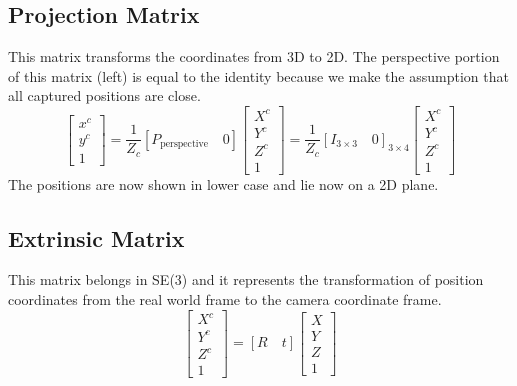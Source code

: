 \subsection{Projection Matrix}
This matrix transforms the coordinates from 3D to 2D. The perspective portion of this matrix (left) is equal to the identity because we make the assumption that all captured positions are close.
$$\left[\begin{array}{c}x^c\\y^c\\1\end{array}\right]=\frac{1}{Z_c}[P_{\text{perspective}} \quad 0]\left[\begin{array}{c}X^c\\Y^c\\Z^c\\1\end{array}\right]=\frac{1}{Z_c}[I_{3 \times 3} \quad 0]_{3 \times 4}\left[\begin{array}{c}X^c\\Y^c\\Z^c\\1\end{array}\right]$$
The positions are now shown in lower case and lie now on a 2D plane.

\subsection{Extrinsic Matrix }
This matrix belongs in SE(3) and it represents the transformation of position coordinates from the real world frame to the camera coordinate frame.
$$\left[\begin{array}{c}X^c \\ Y^c \\Z^c \\ 1 \end{array}\right] = [R \quad t]\left[\begin{array}{c}X \\ Y \\Z \\ 1 \end{array}\right]$$

